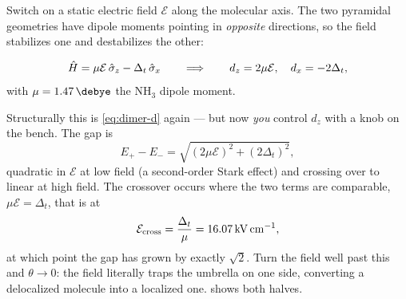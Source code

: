 Switch on a static electric field $\mathcal{E}$ along the molecular axis. The two
pyramidal geometries have dipole moments pointing in \emph{opposite} directions, so the
field stabilizes one and destabilizes the other:

\begin{keyresult}
\vspace{-0.35cm}
\begin{equation}
\hat{H} = \mu\mathcal{E}\,\hat{\sigma}_z - \Delta_t\,\hat{\sigma}_x
\qquad\Longrightarrow\qquad
d_z = 2\mu\mathcal{E}, \quad d_x = -2\Delta_t ,
\label{eq:nh3-stark}
\end{equation}
with $\mu = \SI{1.47}{\debye}$ the NH$_3$ dipole moment.
\end{keyresult}

\noindent
Structurally this is \cref{eq:dimer-d} again --- but now \emph{you} control $d_z$ with a
knob on the bench. The gap is
%
\begin{equation}
E_+-E_- = \sqrt{(2\mu\mathcal{E})^2+(2\Delta_t)^2},
\end{equation}
%
quadratic in $\mathcal{E}$ at low field (a second-order Stark effect) and crossing over
to linear at high field. The crossover occurs where the two terms are comparable,
$\mu\mathcal{E}=\Delta_t$, that is at
%
\begin{equation}
\mathcal{E}_{\rm cross} = \frac{\Delta_t}{\mu} = \SI{16.07}{\kilo\volt\per\centi\meter},
\end{equation}
%
at which point the gap has grown by exactly $\sqrt{2}$. Turn the field well past this
and $\theta\to0$: the field literally traps the umbrella on one side, converting a
delocalized molecule into a localized one.  shows both halves.

